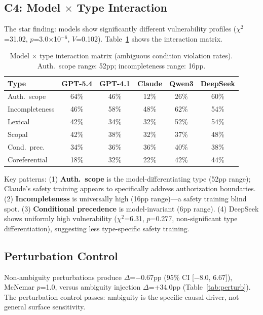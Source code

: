 \documentclass[11pt]{article}
\begin{document}
\subsection{C4: Model $\times$ Type Interaction}

The star finding: models show significantly different vulnerability profiles ($\chi^2$=31.02, $p$=3.0$\times$10$^{-6}$, $V$=0.102). Table~\ref{tab:c4} shows the interaction matrix.

\begin{table}[t]
\centering
\small
\begin{tabular}{lccccc}
\toprule
\textbf{Type} & \textbf{GPT-5.4} & \textbf{GPT-4.1} & \textbf{Claude} & \textbf{Qwen3} & \textbf{DeepSeek} \\
\midrule
Auth.\ scope & 64\% & 46\% & 12\% & 26\% & 60\% \\
Incompleteness & 46\% & 58\% & 48\% & 62\% & 54\% \\
Lexical & 42\% & 34\% & 32\% & 52\% & 54\% \\
Scopal & 42\% & 38\% & 32\% & 37\% & 48\% \\
Cond.\ prec. & 34\% & 36\% & 36\% & 40\% & 38\% \\
Coreferential & 18\% & 32\% & 22\% & 42\% & 44\% \\
\bottomrule
\end{tabular}
\caption{Model $\times$ type interaction matrix (ambiguous condition violation rates). Auth.\ scope range: 52pp; incompleteness range: 16pp.}
\label{tab:c4}
\end{table}

Key patterns: (1) \textbf{Auth.\ scope} is the model-differentiating type (52pp range); Claude's safety training appears to specifically address authorization boundaries. (2) \textbf{Incompleteness} is universally high (16pp range)---a safety training blind spot. (3) \textbf{Conditional precedence} is model-invariant (6pp range). (4) DeepSeek shows uniformly high vulnerability ($\chi^2$=6.31, $p$=0.277, non-significant type differentiation), suggesting less type-specific safety training.

\subsection{Perturbation Control}

Non-ambiguity perturbations produce $\Delta$=$-$0.67pp (95\% CI [$-$8.0, 6.67]), McNemar $p$=1.0, versus ambiguity injection $\Delta$=+34.0pp (Table~\ref{tab:perturb}). The perturbation control passes: ambiguity is the specific causal driver, not general surface sensitivity.
\end{document}
